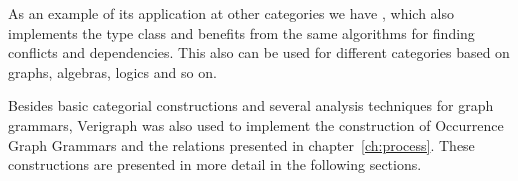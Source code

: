 As an example of its application at other categories we have , which also implements the  type class and benefits from the same algorithms for finding conflicts and dependencies. This also can be used for different categories based on graphs, algebras, logics and so on.

Besides basic categorial constructions and several analysis techniques for graph grammars, Verigraph was also used to implement the construction of Occurrence Graph Grammars and the relations presented in chapter~\ref{ch:process}. These constructions are presented in more detail in the following sections.


